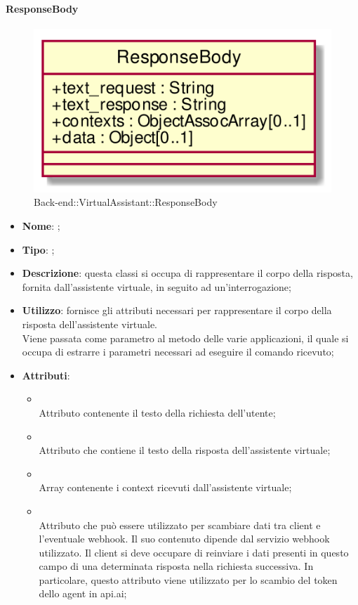 \hypertarget{ResponseBody_label}{\paragraph{ResponseBody}}
\begin{figure}[h]
	\centering
	\includegraphics[width=\textwidth,height=\textheight,keepaspectratio]{images/ClassResponseBody.png}
	\caption{Back-end::VirtualAssistant::ResponseBody}
\end{figure}
\begin{itemize}
	\item \textbf{Nome}: ;
	\item \textbf{Tipo}: ;
	\item \textbf{Descrizione}: questa classi si occupa di rappresentare il corpo della risposta, fornita dall'assistente virtuale, in seguito ad un'interrogazione;
	\item \textbf{Utilizzo}: fornisce gli attributi necessari per rappresentare il corpo della risposta dell'assistente virtuale. \\
Viene passata come parametro al metodo  delle varie applicazioni, il quale si occupa di estrarre i parametri necessari ad eseguire il comando ricevuto;
	\item \textbf{Attributi}:
	\begin{itemize}
		\item[]  \\
		Attributo contenente il testo della richiesta dell'utente;
		\item[]  \\
		Attributo che contiene il testo della risposta dell'assistente virtuale;
		\item[]  \\
		Array contenente i context ricevuti dall'assistente virtuale;
		\item[]  \\
		Attributo che può essere utilizzato per scambiare dati tra client e l'eventuale webhook. Il suo contenuto dipende dal servizio webhook utilizzato. Il client si deve occupare di reinviare i dati presenti in questo campo di una determinata risposta nella richiesta successiva. In particolare, questo attributo viene utilizzato per lo scambio del token dello agent in api.ai;
	\end{itemize}
\end{itemize}

